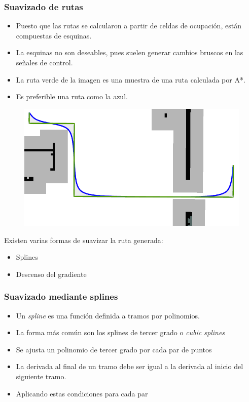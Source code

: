 \begin{frame}\frametitle{Suavizado de rutas}
  \begin{itemize}
  \item Puesto que las rutas se calcularon a partir de celdas de ocupación, están compuestas de esquinas.
  \item La esquinas no son deseables, pues suelen generar cambios bruscos en las señales de control.
  \item La ruta verde de la imagen es una muestra de una ruta calculada por A*.
  \item Es preferible una ruta como la azul. 
  \end{itemize}
  \begin{figure}
    \centering
    \includegraphics[height=0.45\textheight]{Figures/PathSmoothingExample.png}
  \end{figure}
  Existen varias formas de suavizar la ruta generada:
  \begin{itemize}
  \item Splines
  \item Descenso del gradiente
  \end{itemize}
\end{frame}

\begin{frame}\frametitle{Suavizado mediante splines}
  \begin{itemize}
  \item Un \textit{spline} es una función definida a tramos por polinomios.
  \item La forma más común son los splines de tercer grado o \textit{cubic splines}
  \item Se ajusta un polinomio de tercer grado por cada par de puntos
  \item La derivada al final de un tramo debe ser igual a la derivada al inicio del siguiente tramo.
  \item Aplicando estas condiciones para cada par 
  \end{itemize}
  
\end{frame}


